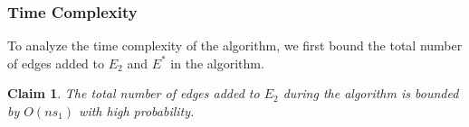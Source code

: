 \documentclass[11pt]{article}
\makeatletter
\newtheorem{claim}[theorem]{Claim}
\theoremstyle{definition}
\theoremstyle{remark}
\newcommand{\ytodo}[1]{\todo[color=blue!20]{Y: #1}}
\newcommand{\sebastian}[1]{\todo[color=green!20]{S: #1}}
\renewcommand{\paragraph}{%
  \@startsection{paragraph}{4}%
  {\z@}{1.4ex \@plus 1ex \@minus .2ex}{-1em}%
  {\normalfont\normalsize\bfseries}%
}
\makeatother
\begin{document}



\subsubsection{Time Complexity} \label{sec:warmup_add_time}

To analyze the time complexity of the algorithm, we first bound the total number of edges added to $E_2$ and $E^*$ in the algorithm. 

\begin{claim} \label{claim_E2}
The total number of edges added to $E_2$ during the algorithm is bounded by $O(ns_1)$ with high probability.%
\end{claim}
\end{document}
